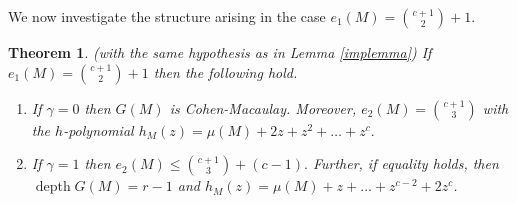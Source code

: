 \documentclass[11pt]{amsart}
\theoremstyle{plain}
\newtheorem{theorem}{Theorem}[section]
\newcommand{\depth}{\operatorname{depth}}
\theoremstyle{plain}
\begin{document}
We now investigate the structure arising in the case $e_1(M)=\binom{c+1}{2}+1$.

\begin{theorem}\label{main+1}
    (with the same hypothesis as in Lemma \ref{implemma}) If $e_1(M)=\binom{c+1}{2}+1$ then the following hold. 
     \begin{enumerate}
         \item \label{1+11} If $\gamma=0$ then $G(M)$ is Cohen-Macaulay. Moreover, $e_2(M)=\binom{c+1}{3}$ with the $h$-polynomial $h_M(z) = \mu(M)+2z+z^2+\ldots+ z^{c}.$
         \item \label{1+12} If $\gamma=1$ then $e_2(M)\leq \binom{c+1}{3}+(c-1).$ Further, if equality holds, then $\depth G(M)= r-1$ and $h_M(z)=\mu(M)+z+\ldots+z^{c-2}+2z^{c}$.
     \end{enumerate} 
\end{theorem}
\end{document}
